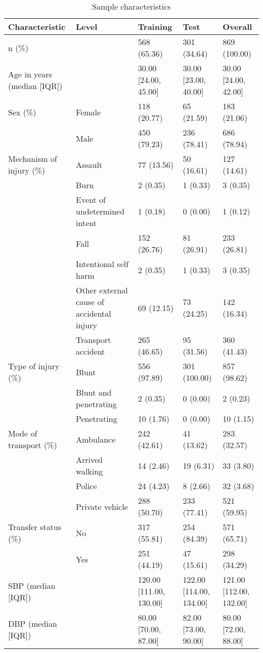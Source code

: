 \documentclass[10pt,letterpaper]{article}\usepackage[]{graphicx}\usepackage[]{color}
\begin{document}
\begin{table}[ht]
\centering
\caption{Sample characteristics} 
\begin{tabular}{lllll}
  \hline
Characteristic & Level & Training & Test & Overall \\ 
  \hline
n (\%) &  & 568 (65.36) & 301 (34.64) & 869 (100.00) \\ 
  Age in years (median [IQR]) &  & 30.00 [24.00, 45.00] & 30.00 [23.00, 40.00] & 30.00 [24.00, 42.00] \\ 
  Sex (\%) & Female & 118 (20.77) & 65 (21.59) & 183 (21.06) \\ 
   & Male & 450 (79.23) & 236 (78.41) & 686 (78.94) \\ 
  Mechanism of injury (\%) & Assault & 77 (13.56) & 50 (16.61) & 127 (14.61) \\ 
   & Burn & 2 (0.35) & 1 (0.33) & 3 (0.35) \\ 
   & Event of undetermined intent & 1 (0.18) & 0 (0.00) & 1 (0.12) \\ 
   & Fall & 152 (26.76) & 81 (26.91) & 233 (26.81) \\ 
   & Intentional self harm & 2 (0.35) & 1 (0.33) & 3 (0.35) \\ 
   & Other external cause of accidental injury & 69 (12.15) & 73 (24.25) & 142 (16.34) \\ 
   & Transport accident & 265 (46.65) & 95 (31.56) & 360 (41.43) \\ 
  Type of injury (\%) & Blunt & 556 (97.89) & 301 (100.00) & 857 (98.62) \\ 
   & Blunt and penetrating & 2 (0.35) & 0 (0.00) & 2 (0.23) \\ 
   & Penetrating & 10 (1.76) & 0 (0.00) & 10 (1.15) \\ 
  Mode of transport (\%) & Ambulance & 242 (42.61) & 41 (13.62) & 283 (32.57) \\ 
   & Arrived walking & 14 (2.46) & 19 (6.31) & 33 (3.80) \\ 
   & Police & 24 (4.23) & 8 (2.66) & 32 (3.68) \\ 
   & Private vehicle & 288 (50.70) & 233 (77.41) & 521 (59.95) \\ 
  Transfer status (\%) & No & 317 (55.81) & 254 (84.39) & 571 (65.71) \\ 
   & Yes & 251 (44.19) & 47 (15.61) & 298 (34.29) \\ 
  SBP (median [IQR]) &  & 120.00 [111.00, 130.00] & 122.00 [114.00, 134.00] & 121.00 [112.00, 132.00] \\ 
  DBP (median [IQR]) &  & 80.00 [70.00, 87.00] & 82.00 [73.00, 90.00] & 80.00 [72.00, 88.00] \\ 

\end{tabular}
\end{table}
\end{document}
